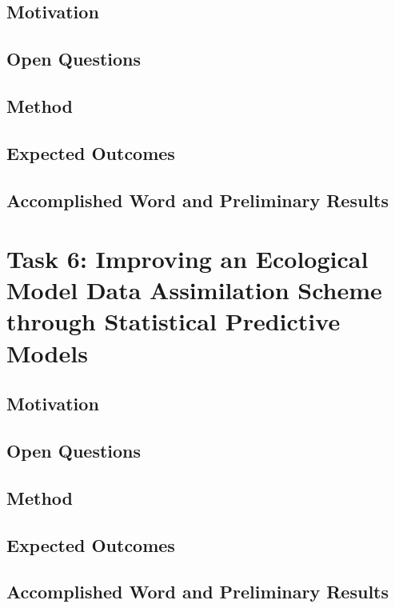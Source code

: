 \subsection{Motivation}
\subsection{Open Questions}
\subsection{Method}
\subsection{Expected Outcomes}
\subsection{Accomplished Word and Preliminary Results}

\section{Task 6: Improving an Ecological Model Data Assimilation Scheme through
Statistical Predictive Models}

\subsection{Motivation}
\subsection{Open Questions}
\subsection{Method}
\subsection{Expected Outcomes}
\subsection{Accomplished Word and Preliminary Results}
